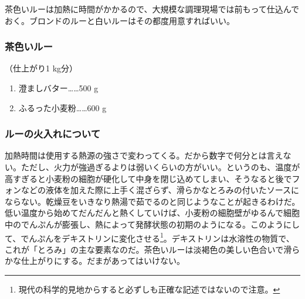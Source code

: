 茶色いルーは加熱に時間がかかるので、大規模な調理現場では前もって仕込んでおく。ブロンドのルーと白いルーはその都度用意すればいい。
\begin{recette}
\hypertarget{roux-brun}{%
\subsubsection{茶色いルー}\label{roux-brun}}


 

（仕上がり1 kg分）

\begin{enumerate}
\def\labelenumi{\arabic{enumi}.}
\tightlist
\item
  澄ましバター\ldots{}\ldots{}500 g
\item
  ふるった小麦粉\ldots{}\ldots{}600 g
\end{enumerate}

\hypertarget{cuisson-des-roux}{%
\subsubsection{ルーの火入れについて}\label{cuisson-des-roux}}


加熱時間は使用する熱源の強さで変わってくる。だから数字で何分とは言えない。ただし、火力が強過ぎるよりは弱いくらいの方がいい。というのも、温度が高すぎると小麦粉の細胞が硬化して中身を閉じ込めてしまい、そうなると後でフォンなどの液体を加えた際に上手く混ざらず、滑らかなとろみの付いたソースにならない。乾燥豆をいきなり熱湯で茹でるのと同じようなことが起きるわけだ。低い温度から始めてだんだんと熱くしていけば、小麦粉の細胞壁がゆるんで細胞中のでんぷんが膨張し、熱によって発酵状態の初期のようになる。このようにして、でんぷんをデキストリンに変化させる\footnote{現代の科学的見地からすると必ずしも正確な記述ではないので注意。}。デキストリンは水溶性の物質で、これが「とろみ」の主な要素なのだ。茶色いルーは淡褐色の美しい色合いで滑らかな仕上がりにする。だまがあってはいけない。


\end{recette}
